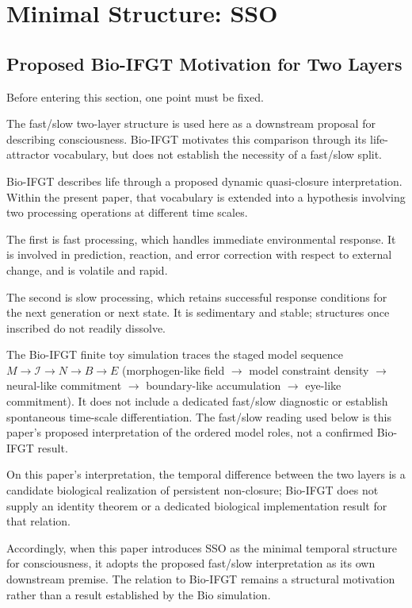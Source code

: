 \section{Minimal Structure: SSO}


\subsection{Proposed Bio-IFGT Motivation for Two Layers}


Before entering this section, one point must be fixed.

The fast/slow two-layer structure is used here as a downstream proposal for describing consciousness. Bio-IFGT motivates this comparison through its life-attractor vocabulary, but does not establish the necessity of a fast/slow split.

Bio-IFGT describes life through a proposed dynamic quasi-closure interpretation. Within the present paper, that vocabulary is extended into a hypothesis involving two processing operations at different time scales.

The first is fast processing, which handles immediate environmental response. It is involved in prediction, reaction, and error correction with respect to external change, and is volatile and rapid.

The second is slow processing, which retains successful response conditions for the next generation or next state. It is sedimentary and stable; structures once inscribed do not readily dissolve.

The Bio-IFGT finite toy simulation traces the staged model sequence
$M \rightarrow \mathcal{I} \rightarrow N \rightarrow B \rightarrow E$
(morphogen-like field $\rightarrow$ model constraint density $\rightarrow$ neural-like commitment $\rightarrow$ boundary-like accumulation $\rightarrow$ eye-like commitment). It does not include a dedicated fast/slow diagnostic or establish spontaneous time-scale differentiation. The fast/slow reading used below is this paper's proposed interpretation of the ordered model roles, not a confirmed Bio-IFGT result.

On this paper's interpretation, the temporal difference between the two layers is a candidate biological realization of persistent non-closure; Bio-IFGT does not supply an identity theorem or a dedicated biological implementation result for that relation.

Accordingly, when this paper introduces SSO as the minimal temporal structure for consciousness, it adopts the proposed fast/slow interpretation as its own downstream premise. The relation to Bio-IFGT remains a structural motivation rather than a result established by the Bio simulation.

